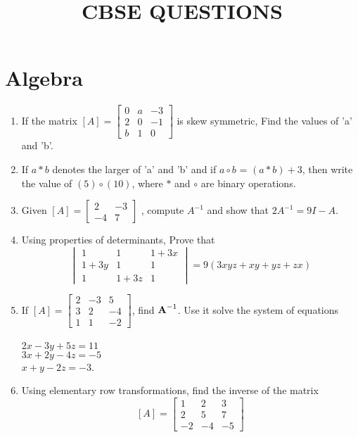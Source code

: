 \documentclass{article}
\providecommand{\sbrak}[1]{\ensuremath{{}\left[#1\right]}}
\providecommand{\brak}[1]{\ensuremath{\left(#1\right)}}
\begin{document}
\title{\textbf{CBSE QUESTIONS}}
\date{}
\maketitle{}

\section{Algebra}
\begin{enumerate}
 \item If the matrix $\sbrak A=\begin{bmatrix}
		0 & a & -3\\
		2 & 0 & -1\\
		b & 1 & 0
                \end{bmatrix}$ is skew symmetric, Find the values of 'a' and 'b'.
\item If $a \ast b$ denotes the larger of 'a' and 'b' and if $a \circ b$ = $ \brak{a \ast b}+ 3$, then write the value of $ \brak{5} \circ \brak{10} $, where $\ast$ and $\circ$ are binary operations.  
\item Given $\sbrak A = \begin{bmatrix}
		2 & -3\\
		-4 & 7
\end{bmatrix}$ , compute $A^{-1}$ and show that $2A^{-1}=9I - A$.
\item Using properties of determinants, Prove that \[ \begin{vmatrix}
		1 & 1 & 1+3x \\
		1+3y & 1 & 1 \\
		1 & 1+3z & 1
	\end{vmatrix}
	=9\brak{3xyz+xy+yz+zx}\]
\item If $\sbrak A=\begin{bmatrix}
		2 & -3 & 5 \\
		3 & 2 & -4 \\
		1 & 1 & -2
\end{bmatrix}$, find $\textbf A^{-1}$. Use it solve the system of equations\\
\\
$2x-3y+5z=11$\\
$3x+2y-4z=-5$\\
$x+y-2z=-3$.
\item Using elementary row transformations, find the inverse of the matrix 
	\[  \sbrak A=\begin{bmatrix}
		1 & 2 & 3\\
		2 & 5 & 7\\
		-2 & -4 & -5
	\end{bmatrix}\]
\end{enumerate}
\end{document}
